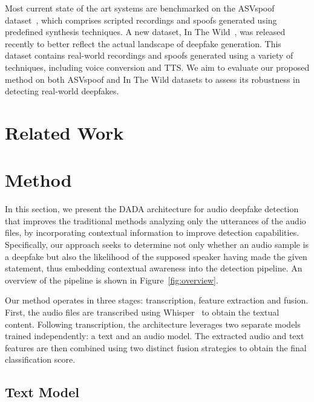 \documentclass{Interspeech}
\begin{document}
Most current state of the art systems are benchmarked on the ASVspoof
dataset~\cite{ASVspoof_21}, which comprises scripted recordings and spoofs
generated using predefined synthesis techniques. A new dataset, In The
Wild~\cite{in_the_wild}, was released recently to better reflect the actual
landscape of deepfake generation. This dataset contains real-world recordings
and spoofs generated using a variety of techniques, including voice conversion
and TTS. We aim to evaluate our proposed method on both ASVspoof and In The
Wild datasets to assess its robustness in detecting real-world deepfakes.

\section{Related Work}\label{sec:related_work}

\section{Method}\label{sec:method}

In this section, we present the DADA architecture for audio deepfake detection
that improves the traditional methods analyzing only the utterances of the
audio files, by incorporating contextual information to improve detection
capabilities. Specifically, our approach seeks to determine not only whether an
audio sample is a deepfake but also the likelihood of the supposed speaker
having made the given statement, thus embedding contextual awareness into the
detection pipeline. An overview of the pipeline is shown in
Figure~\ref{fig:overview}.

Our method operates in three stages: transcription, feature extraction and
fusion. First, the audio files are transcribed using
Whisper~\cite{radford2023robust} to obtain the textual content. Following
transcription, the architecture leverages two separate models trained
independently: a text and an audio model. The extracted audio and text features
are then combined using two distinct fusion strategies to obtain the final
classification score.
\subsection{Text Model}
\end{document}

